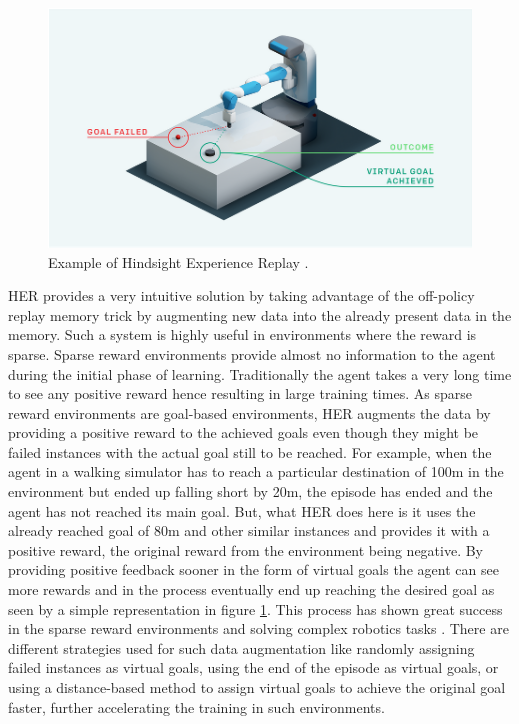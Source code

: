\begin{figure}[h!]
    \centering
    \includegraphics[width=\textwidth]{images/HER.png}
    \caption{Example of Hindsight Experience Replay \cite{andrychowicz2018hindsight} \cite{plappert2018multigoal}.}
    \label{fig:HER}
\end{figure}

HER provides a very intuitive solution by taking advantage of the off-policy replay memory trick by augmenting new data into the already present data in the memory. Such a system is highly useful in environments where the reward is sparse. Sparse reward environments provide almost no information to the agent during the initial phase of learning. Traditionally the agent takes a very long time to see any positive reward hence resulting in large training times. As sparse reward environments are goal-based environments, HER augments the data by providing a positive reward to the achieved goals even though they might be failed instances with the actual goal still to be reached. For example, when the agent in a walking simulator has to reach a particular destination of 100m in the environment but ended up falling short by 20m, the episode has ended and the agent has not reached its main goal. But, what HER does here is it uses the already reached goal of 80m and other similar instances and provides it with a positive reward, the original reward from the environment being negative. By providing positive feedback sooner in the form of virtual goals the agent can see more rewards and in the process eventually end up reaching the desired goal as seen by a simple representation in figure \ref{fig:HER}. This process has shown great success in the sparse reward environments and solving complex robotics tasks \cite{plappert2018multigoal}. There are different strategies used for such data augmentation like randomly assigning failed instances as virtual goals, using the end of the episode as virtual goals, or using a distance-based method \cite{HERER} to assign virtual goals to achieve the original goal faster, further accelerating the training in such environments. \\

